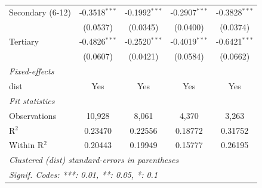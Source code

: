 \begin{tabular}{lcccc}
   Secondary (6-12)                  & -0.3518$^{***}$         & -0.1992$^{***}$         & -0.2907$^{***}$         & -0.3828$^{***}$\\   
                                     & (0.0537)                & (0.0345)                & (0.0400)                & (0.0374)\\   
   Tertiary                          & -0.4826$^{***}$         & -0.2520$^{***}$         & -0.4019$^{***}$         & -0.6421$^{***}$\\   
                                     & (0.0607)                & (0.0421)                & (0.0584)                & (0.0662)\\   
   \midrule
   \emph{Fixed-effects}\\
   dist                              & Yes                     & Yes                     & Yes                     & Yes\\  
   \midrule
   \emph{Fit statistics}\\
   Observations                      & 10,928                  & 8,061                   & 4,370                   & 3,263\\  
   R$^2$                             & 0.23470                 & 0.22556                 & 0.18772                 & 0.31752\\  
   Within R$^2$                      & 0.20443                 & 0.19949                 & 0.15777                 & 0.26195\\  
   \midrule \midrule
   \multicolumn{5}{l}{\emph{Clustered (dist) standard-errors in parentheses}}\\
   \multicolumn{5}{l}{\emph{Signif. Codes: ***: 0.01, **: 0.05, *: 0.1}}\\
\end{tabular}
\par\endgroup


